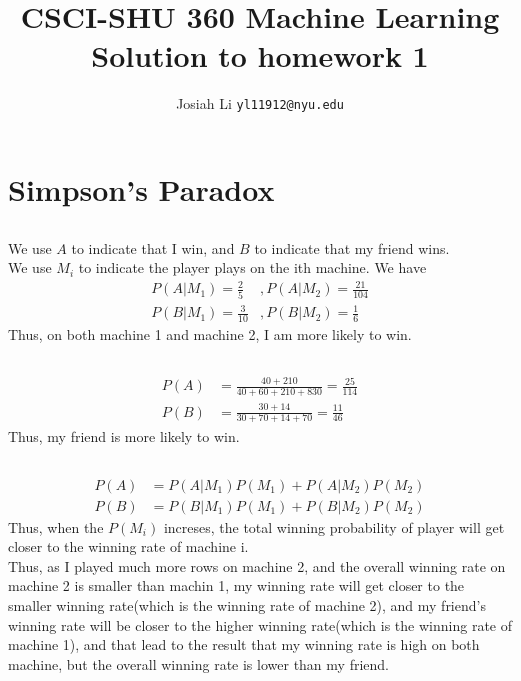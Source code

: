 \documentclass{article}
\title{CSCI-SHU 360 Machine Learning\\
    Solution to homework 1}
\author{Josiah Li \texttt{yl11912@nyu.edu}}
\begin{document}
    \maketitle
\section{Simpson's Paradox}\label{sec:Simpson's Paradox} %

\subsection{}\label{sub:} %
We use $ A $ to indicate that I win, and $ B $ to indicate that my friend wins.\\
We use $ M_i $ to indicate the player plays on the ith machine.
We have 
\begin{align*}
    P(A|M_1) = \frac{2}{5}&, P(A|M_2) = \frac{21}{104}\\
    P(B|M_1) = \frac{3}{10 }&, P(B|M_2) = \frac{1}{6}
\end{align*}
Thus, on both machine 1 and machine 2, I am more likely to win.

\subsection{}
\begin{align*}
    P(A) &= \frac{40 + 210}{40 + 60 + 210 + 830} = \frac{25}{114} \\
    P(B) &= \frac{30 + 14}{30 + 70 + 14 + 70} = \frac{11 }{46}
\end{align*}
Thus, my friend is more likely to win.

\subsection{}\label{sub:} %
\begin{align*}
    P(A) &= P(A|M_1)P(M_1) + P(A|M_2)P(M_2) \\ 
    P(B) &= P(B|M_1)P(M_1) + P(B|M_2)P(M_2)
\end{align*}
Thus, when the $ P(M_i) $ increses, the total winning probability of player will get closer to the winning rate of machine i. \\ 
Thus, as I played much more rows on machine 2, and the overall winning rate on machine 2 is smaller than machin 1, my winning rate will get closer to the smaller winning rate(which is the winning rate of machine 2), and my friend's winning rate will be closer to the higher winning rate(which is the winning rate of machine 1), and that lead to the result that my winning rate is high on both machine, but the overall winning rate is lower than my friend.
\end{document}
